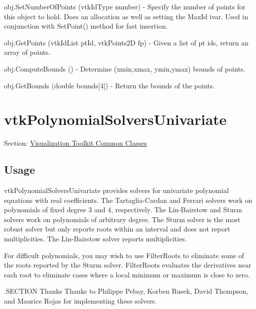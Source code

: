 \begin{DoxyItemize}
\item {\ttfamily obj.\-Set\-Number\-Of\-Points (vtk\-Id\-Type number)} -\/ Specify the number of points for this object to hold. Does an allocation as well as setting the Max\-Id ivar. Used in conjunction with Set\-Point() method for fast insertion.  
\item {\ttfamily obj.\-Get\-Points (vtk\-Id\-List pt\-Id, vtk\-Points2\-D fp)} -\/ Given a list of pt ids, return an array of points.  
\item {\ttfamily obj.\-Compute\-Bounds ()} -\/ Determine (xmin,xmax, ymin,ymax) bounds of points.  
\item {\ttfamily obj.\-Get\-Bounds (double bounds\mbox{[}4\mbox{]})} -\/ Return the bounds of the points.  
\end{DoxyItemize}\hypertarget{vtkcommon_vtkpolynomialsolversunivariate}{}\section{vtk\-Polynomial\-Solvers\-Univariate}\label{vtkcommon_vtkpolynomialsolversunivariate}
Section\-: \hyperlink{sec_vtkcommon}{Visualization Toolkit Common Classes} \hypertarget{vtkwidgets_vtkxyplotwidget_Usage}{}\subsection{Usage}\label{vtkwidgets_vtkxyplotwidget_Usage}
vtk\-Polynomial\-Solvers\-Univariate provides solvers for univariate polynomial equations with real coefficients. The Tartaglia-\/\-Cardan and Ferrari solvers work on polynomials of fixed degree 3 and 4, respectively. The Lin-\/\-Bairstow and Sturm solvers work on polynomials of arbitrary degree. The Sturm solver is the most robust solver but only reports roots within an interval and does not report multiplicities. The Lin-\/\-Bairstow solver reports multiplicities.

For difficult polynomials, you may wish to use Filter\-Roots to eliminate some of the roots reported by the Sturm solver. Filter\-Roots evaluates the derivatives near each root to eliminate cases where a local minimum or maximum is close to zero.

.S\-E\-C\-T\-I\-O\-N Thanks Thanks to Philippe Pebay, Korben Rusek, David Thompson, and Maurice Rojas for implementing these solvers.

